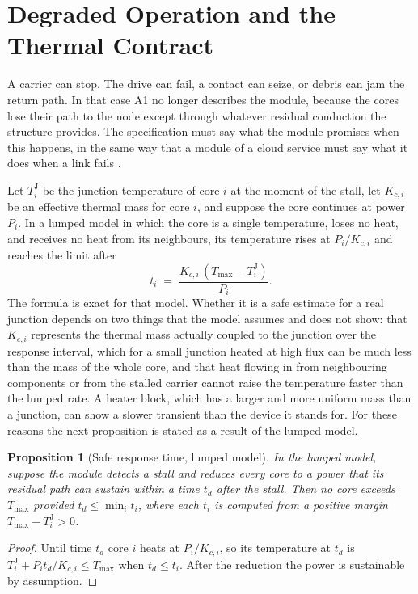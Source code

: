 \documentclass[11pt,openany]{book}
\theoremstyle{plain}
\newtheorem{proposition}[theorem]{Proposition}
\theoremstyle{definition}
\theoremstyle{remark}
\begin{document}
\section{Degraded Operation and the Thermal Contract}
\label{sec:degraded}

A carrier can stop. The drive can fail, a contact can seize, or debris can jam the return path. In that case A1 no longer describes the module, because the cores lose their path to the node except through whatever residual conduction the structure provides. The specification must say what the module promises when this happens, in the same way that a module of a cloud service must say what it does when a link fails \cite{flyxion-gpu}.

Let $T^{\mathrm J}_i$ be the junction temperature of core $i$ at the moment of the stall, let $K_{c,i}$ be an effective thermal mass for core $i$, and suppose the core continues at power $P_i$. In a lumped model in which the core is a single temperature, loses no heat, and receives no heat from its neighbours, its temperature rises at $P_i/K_{c,i}$ and reaches the limit after
\[
t_i \;=\; \frac{K_{c,i}\,(T_{\max}-T^{\mathrm J}_i)}{P_i}.
\]
The formula is exact for that model. Whether it is a safe estimate for a real junction depends on two things that the model assumes and does not show: that $K_{c,i}$ represents the thermal mass actually coupled to the junction over the response interval, which for a small junction heated at high flux can be much less than the mass of the whole core, and that heat flowing in from neighbouring components or from the stalled carrier cannot raise the temperature faster than the lumped rate. A heater block, which has a larger and more uniform mass than a junction, can show a slower transient than the device it stands for. For these reasons the next proposition is stated as a result of the lumped model.

\begin{proposition}[Safe response time, lumped model]\label{prop:stall}
In the lumped model, suppose the module detects a stall and reduces every core to a power that its residual path can sustain within a time $t_d$ after the stall. Then no core exceeds $T_{\max}$ provided $t_d\le\min_i t_i$, where each $t_i$ is computed from a positive margin $T_{\max}-T^{\mathrm J}_i>0$.
\end{proposition}
\begin{proof}
Until time $t_d$ core $i$ heats at $P_i/K_{c,i}$, so its temperature at $t_d$ is $T^{\mathrm J}_i+P_it_d/K_{c,i}\le T_{\max}$ when $t_d\le t_i$. After the reduction the power is sustainable by assumption.
\end{proof}
\end{document}
